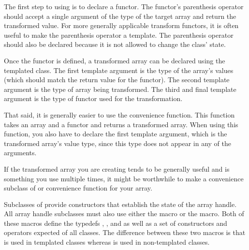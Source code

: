 The first step to using  is to declare
a functor. The functor's parenthesis operator should accept a single
argument of the type of the target array and return the transformed value.
For more generally applicable transform functors, it is often useful to
make the parenthesis operator a template. The parenthesis operator should
also be declared  because it is not allowed to change the
class' state.


Once the functor is defined, a transformed array can be declared using the
templated  class. The first template
argument is the type of the array's values (which should match the return
value for the functor). The second template argument is the type of array
being transformed. The third and final template argument is the type of
functor used for the transformation.

That said, it is generally easier to use the
 convenience function. This function
takes an array and a functor and returns a transformed array. When using
this function, you also have to declare the first template argument, which
is the transformed array's value type, since this type does not appear in
any of the arguments.


If the transformed array you are creating tends to be generally useful and
is something you use multiple times, it might be worthwhile to make a
convenience subclass of  or convenience
 function for your array.


\label{sec:VTKM_ARRAY_HANDLE_SUBCLASS}

Subclasses of  provide constructors that
establish the state of the array handle. All array handle subclasses must
also use either the  macro or the
 macro. Both of these macros
define the typedefs , , and
 as well as a set of constructors and operators
expected of all  classes. The difference
between these two macros is that 
is used in templated classes whereas
 is used in non-templated
classes.

